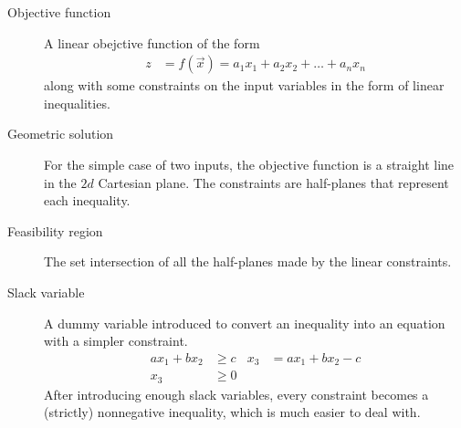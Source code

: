 \begin{description}
    \item[Objective function] A linear obejctive function of the form
        \begin{align}
            z & = f(\vec{x}) = a_1x_1 + a_2x_2 + \dots + a_nx_n
        \end{align}
        along with some constraints on the input variables in the form of linear
        inequalities.

    \item[Geometric solution] For the simple case of two inputs, the objective
        function is a straight line in the $ 2d $ Cartesian plane. The constraints
        are half-planes that represent each inequality.

    \item[Feasibility region] The set intersection of all the half-planes made by
        the linear constraints.

    \item[Slack variable] A dummy variable introduced to convert an inequality into
        an equation with a simpler constraint.
        \begin{align}
            ax_1 + bx_2 & \geq c & x_3 & = ax_1 + bx_2 - c \\
            x_3         & \geq 0
        \end{align}
        After introducing enough slack variables, every constraint becomes a (strictly)
        nonnegative inequality, which is much easier to deal with.


\end{description}
